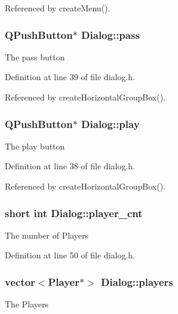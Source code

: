 Referenced by create\-Menu().

\hypertarget{class_dialog_a1296240f36b4a11c4cf70a709aced623}{
\subsubsection[{pass}]{\setlength{\rightskip}{0pt plus 5cm}Q\-Push\-Button$\ast$ Dialog\-::pass\hspace{0.3cm}{\ttfamily [private]}}}\label{class_dialog_a1296240f36b4a11c4cf70a709aced623}
The pass button 

Definition at line 39 of file dialog.\-h.



Referenced by create\-Horizontal\-Group\-Box().

\hypertarget{class_dialog_afda3b2243f835037bfeb1322289e4f5a}{
\subsubsection[{play}]{\setlength{\rightskip}{0pt plus 5cm}Q\-Push\-Button$\ast$ Dialog\-::play\hspace{0.3cm}{\ttfamily [private]}}}\label{class_dialog_afda3b2243f835037bfeb1322289e4f5a}
The play button 

Definition at line 38 of file dialog.\-h.



Referenced by create\-Horizontal\-Group\-Box().

\hypertarget{class_dialog_a5130628f920537a9359fbdc4058af7b7}{
\subsubsection[{player\-\_\-cnt}]{\setlength{\rightskip}{0pt plus 5cm}short int Dialog\-::player\-\_\-cnt\hspace{0.3cm}{\ttfamily [private]}}}\label{class_dialog_a5130628f920537a9359fbdc4058af7b7}
The number of Players 

Definition at line 50 of file dialog.\-h.

\hypertarget{class_dialog_a93e79b9554adff375010cc56a29c82b0}{
\subsubsection[{players}]{\setlength{\rightskip}{0pt plus 5cm}vector$<${\bf Player}$\ast$$>$ Dialog\-::players\hspace{0.3cm}{\ttfamily [private]}}}\label{class_dialog_a93e79b9554adff375010cc56a29c82b0}
The Players 

